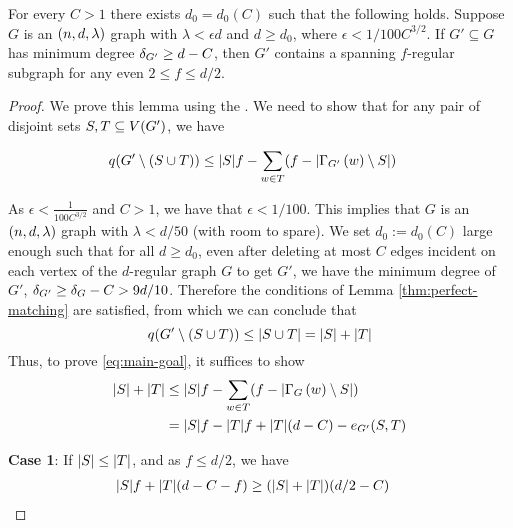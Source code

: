 \documentclass[11pt]{article}
\begin{document}
\begin{lemma}\label{lemma:f-factor}
  For every $C > 1$ there exists $d_0 = d_0(C)$ such that the following holds.
Suppose $G$ is an $\EnDeeLambda$ graph with $\lambda < \epsilon d$ and $d \ge d_0$, where $\epsilon < 1/100C^{3/2}$.
If $G' \subseteq G$ has minimum degree $\MinimalDegree{G'} \ge d - C$, then $G'$ contains a spanning $f$-regular subgraph for any even $2 \le f \le d/2$. 
\end{lemma}

\begin{proof}
  We prove this lemma using the .
  We need to show that for any pair of disjoint sets $S, T \subseteq \Vertices{G'}$, we have

  \begin{align}
    \OddComponents{G' \setminus (S \cup T)} &\le \Size{S}f - \sum_{w \in T} (f - \Size{\Neighbourhood{G'}{w} \setminus S}) \label{eq:main-goal}
  \end{align}

  As $\epsilon < \frac{1}{100C^{3/2}}$ and $C > 1$, we have that $\epsilon < 1/100$. 
This implies that $G$ is an $\EnDeeLambda$ graph with $\lambda < d/50$ (with room to spare).
We set $d_0 := d_0(C)$ large enough such that for all $d \ge d_0$, even after deleting at most $C$ edges incident on each vertex of the $d$-regular graph $G$ to get $G'$, we have the minimum degree of $G'$, $\MinimalDegree{G'} \ge  \MinimalDegree{G} - C > 9d/10$.
Therefore the conditions of Lemma \ref{thm:perfect-matching} are satisfied, from which we can conclude that $$\OddComponents{G' \setminus (S \cup T)} \le \Size{S \cup T} = |S| + |T|$$
Thus, to prove \eqref{eq:main-goal}, it suffices to show
  \begin{align}
    |S| + |T| &\le |S|f - \sum_{w \in T} (f - \Size{\Neighbourhood{G}{w} \setminus S})   \\
              &=\Size{S}f - \Size{T}f + \Size{T}(d-C) - \CutEdges{S}{T}{G'}  \label{eq:to-show}
  \end{align}  

  \textbf{Case 1}: If $\Size{S} \leq \Size{T}$, and as $f \leq d/2$, we have 
  \begin{align}
    \Size{S}f + \Size{T}(d-C-f)  &\ge (\Size{S} + \Size{T})(d/2 -C) \label{eq:to-show-1}
  \end{align}


\end{proof}
\end{document}
